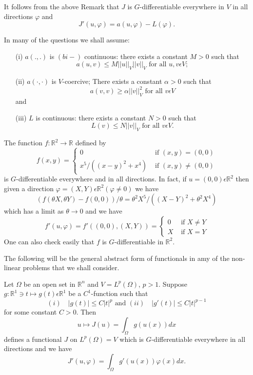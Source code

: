 It follows from the above Remark that $J$ is $G$-differentiable everywhere in $V$ in all directions $\varphi$ and 
$$
J'(u, \varphi) = a(u, \varphi) - L(\varphi).
$$

In many of the questions we shall assume:
\begin{enumerate}
\item[(i)] $a(.,.)$ is $(bi-)$ continuous: there exists a constant $M > 0$ such that 
$$
a(u, v) \leq M || u ||_{V} || v ||_{V} \text{ for all } u, v \epsilon V; 
$$
\item[(ii)] $a(\cdot, \cdot)$ is $V$-coercive; There exists a constant $\alpha > 0$ such that 
$$
a(v, v) \geq \alpha || v ||_{V}^{2} \text{ for all } v \epsilon V
$$
and
\item[(iii)] $L$ is continuous: there exists a constant $N > 0$ such that
$$
L(v) \leq N || v ||_{V} \text{ for all } v \epsilon V.
$$\pageoriginale
\end{enumerate}

\begin{example}\label{chap1-exam1.2}
The function $f : \mathbb{R}^{2} \to \mathbb{R}$ defined by
\begin{equation*}
f(x, y) = 
\begin{cases}
0 & \text{ if } (x, y) = (0, 0)\\
x^{5}/((x-y)^{2} + x^{4}) & \text{ if } (x, y) \neq (0, 0)
\end{cases}
\end{equation*}
is $G$-differentiable everywhere and in all directions. In fact, if $u = (0, 0) \epsilon \mathbb{R}^{2}$ then given a direction $\varphi = (X, Y) \epsilon \mathbb{R}^{2} (\varphi \neq 0)$ we have
$$
(f(\theta X, \theta Y) - f(0, 0))/ \theta = \theta^{2} X^{5}/ ((X - Y)^{2} + \theta^{2} X^{4})
$$
which has a limit as $\theta \to 0$ and we have
\begin{equation*}
f'(u, \varphi) = f'((0, 0), (X, Y)) = 
\begin{cases}
0 & \text{ if } X \neq Y\\
X & \text{ if } X = Y
\end{cases}
\end{equation*}
One can also check easily that $f$  is $G$-differentiable in $\mathbb{R}^{2}$.
\end{example}

The following will be the general abstract form of functionals in amy of the non-linear problems that we shall consider.

\begin{example}\label{chap1-exam1.3}
Let $\Omega$ be an open set in $\mathbb{R}^{n}$ and $V = L^{p}(\Omega)$, $p > 1$. Suppose $g : \mathbb{R}^{1} \ni t \mapsto g(t) \epsilon \mathbb{R}^{1}$ be a $C^{1}$-function such that
$$
(i)\quad  |g(t)|\leq C|t|^{p} \text{ and } (ii)\quad |g'(t)| \leq C|t|^{p-1}
$$
for some constant $C > 0$. Then
$$
u \mapsto J(u) = \int_{\Omega} g(u(x)) dx
$$
defines a functional $J$ on $L^{p}(\Omega) = V$ which is $G$-differentiable everywhere in all directions and we have
$$
J'(u, \varphi) = \int_{\Omega} g'(u(x)) \varphi (x) dx.
$$\pageoriginale
\end{example}

